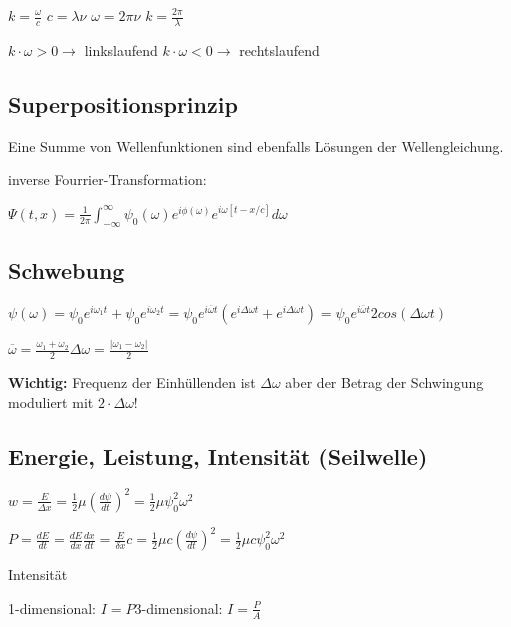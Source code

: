 \documentclass[10pt,a4paper]{scrartcl}
\begin{document}
\begin{multicols*}{3}
	\vspace{1ex}
	
	$k=\frac{\omega}{c}$ \hfill $c=\lambda \nu$ \hfill $\omega=2\pi\nu$ \hfill $k=\frac{2\pi}{\lambda}$
	
	$k\cdot \omega >0 \rightarrow$ linkslaufend \hfill $k\cdot \omega <0\rightarrow$ rechtslaufend
	\subsection{Superpositionsprinzip}
	
	Eine Summe von Wellenfunktionen sind ebenfalls Lösungen der Wellengleichung.
	
	inverse Fourrier-Transformation:
	
	$\Psi(t,x)=\frac{1}{2\pi}\int_{-\infty}^{\infty}{\psi_0(\omega)e^{i\phi(\omega)}e^{i\omega[t-x/c]}d\omega}$
	
	\subsection{Schwebung}
	
	\footnotesize
	$\psi(\omega)=\psi_0e^{i\omega_1t}+\psi_0e^{i\omega_2t}=\psi_0e^{i\overline{\omega}t}(e^{i\Delta \omega t}+e^{i\Delta\omega t})=\psi_0e^{i\overline{\omega}t}2cos(\Delta\omega t)$
	\normalsize
	
	\hfill$\overline{\omega}=\frac{\omega_1+\omega_2}{2}$\hfill$\Delta \omega =\frac{|\omega_1-\omega_2|}{2}$
	
	\textbf{Wichtig:} Frequenz der Einhüllenden ist $\Delta\omega$ aber der Betrag der Schwingung moduliert mit $2\cdot\Delta\omega$!
	
	
	 
	
	\subsection{Energie, Leistung, Intensität (Seilwelle)}
	
	$w=\frac{E}{\Delta x}=\frac{1}{2}\mu(\frac{d\psi}{dt})^2=\frac{1}{2}\mu\psi_0^2\omega^2$
	
	$P=\frac{dE}{dt}=\frac{dE}{dx}\frac{dx}{dt}=\frac{E}{\delta x}c=\frac{1}{2}\mu c(\frac{d\psi}{dt})^2=\frac{1}{2}\mu c\psi_0^2\omega^2$
	
	Intensität
	
	1-dimensional: \hspace{3ex} $I=P$\hfill 3-dimensional: \hspace{3ex} $I=\frac{P}{A}$
	

\end{multicols*}
\end{document}
